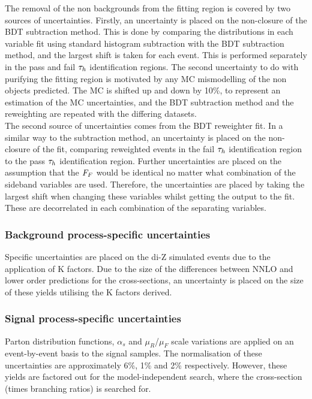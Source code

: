 The removal of the non \jtth backgrounds from the fitting region is covered by two sources of uncertainties.
Firstly, an uncertainty is placed on the non-closure of the \ac{BDT} subtraction method. 
This is done by comparing the distributions in each variable fit using standard histogram subtraction with the \ac{BDT} subtraction method, and the largest shift is taken for each event. 
This is performed separately in the pass and fail $\tau_{h}$ identification regions.
The second uncertainty to do with purifying the fitting region is motivated by any \ac{MC} mismodelling of the non \jtth objects predicted.
The MC is shifted up and down by 10\%, to represent an estimation of the MC uncertainties, and the \ac{BDT} subtraction method and the reweighting are repeated with the differing datasets. \\

The second source of uncertainties comes from the \ac{BDT} reweighter fit.
In a similar way to the subtraction method, an uncertainty is placed on the non-closure of the fit, comparing reweighted events in the fail $\tau_{h}$ identification region to the pass $\tau_{h}$ identification region.
Further uncertainties are placed on the assumption that the $F_{F}$ would be identical no matter what combination of the sideband variables are used.
Therefore, the uncertainties are placed by taking the largest shift when changing these variables whilst getting the output to the fit.
These are decorrelated in each combination of the separating variables.

\subsubsection{Background process-specific uncertainties}
Specific uncertainties are placed on the di-Z simulated events due to the application of K factors.
Due to the size of the differences between \ac{NNLO} and lower order predictions for the cross-sections, an uncertainty is placed on the size of these yields utilising the K factors derived.

\subsubsection{Signal process-specific uncertainties}
Parton distribution functions, $\alpha_s$ and $\mu_{R}$/$\mu_{F}$ scale variations are applied on an event-by-event basis to the signal samples.
The normalisation of these uncertainties are approximately 6\%, 1\% and 2\% respectively. 
However, these yields are factored out for the model-independent search, where the cross-section (times branching ratios) is searched for.

